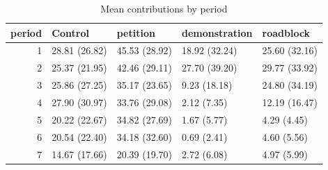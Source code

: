 \begin{table}[ht]
\centering
\begin{tabular}{rllll}
  \hline
period & Control & petition & demonstration & roadblock \\ 
  \hline
1 & 28.81 (26.82) & 45.53 (28.92) & 18.92 (32.24) & 25.60 (32.16) \\ 
  2 & 25.37 (21.95) & 42.46 (29.11) & 27.70 (39.20) & 29.77 (33.92) \\ 
  3 & 25.86 (27.25) & 35.17 (23.65) & 9.23 (18.18) & 24.80 (34.19) \\ 
  4 & 27.90 (30.97) & 33.76 (29.08) & 2.12 (7.35) & 12.19 (16.47) \\ 
  5 & 20.22 (22.67) & 34.82 (27.69) & 1.67 (5.77) & 4.29 (4.45) \\ 
  6 & 20.54 (22.40) & 34.18 (32.60) & 0.69 (2.41) & 4.60 (5.56) \\ 
  7 & 14.67 (17.66) & 20.39 (19.70) & 2.72 (6.08) & 4.97 (5.99) \\ 
   \hline
\end{tabular}
\caption{Mean contributions by period} 
\label{tab:periods}
\end{table}
